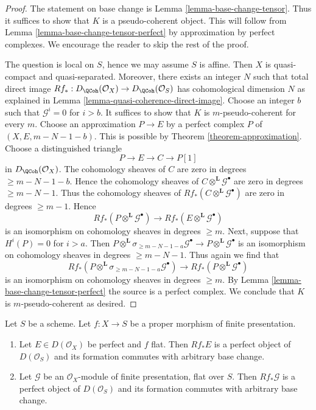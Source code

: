 \begin{proof}
The statement on base change is Lemma \ref{lemma-base-change-tensor}.
Thus it suffices to show that $K$ is a pseudo-coherent object.
This will follow from Lemma \ref{lemma-base-change-tensor-perfect}
by approximation by perfect complexes. We encourage the reader to
skip the rest of the proof.

\medskip\noindent
The question is local on $S$, hence we may assume $S$ is affine.
Then $X$ is quasi-compact and quasi-separated. Moreover, there
exists an integer $N$ such that total direct image
$Rf_* : D_\QCoh(\mathcal{O}_X) \to D_\QCoh(\mathcal{O}_S)$
has cohomological dimension $N$ as explained in
Lemma \ref{lemma-quasi-coherence-direct-image}.
Choose an integer $b$ such that $\mathcal{G}^i = 0$ for $i > b$.
It suffices to show that $K$ is $m$-pseudo-coherent for
every $m$. Choose an approximation $P \to E$ by a perfect complex $P$
of $(X, E, m - N - 1 - b)$. This is possible by
Theorem \ref{theorem-approximation}.
Choose a distinguished triangle
$$
P \to E \to C \to P[1]
$$
in $D_\QCoh(\mathcal{O}_X)$. The cohomology sheaves of $C$ are zero
in degrees $\geq m - N - 1 - b$. Hence the cohomology sheaves of
$C \otimes^\mathbf{L} \mathcal{G}^\bullet$ are zero in degrees
$\geq m - N - 1$. Thus the cohomology sheaves of
$Rf_*(C \otimes^\mathbf{L} \mathcal{G}^\bullet)$
are zero in degrees $\geq m - 1$.
Hence
$$
Rf_*(P \otimes^\mathbf{L} \mathcal{G}^\bullet) \to
Rf_*(E \otimes^\mathbf{L} \mathcal{G}^\bullet)
$$
is an isomorphism on cohomology sheaves in degrees $\geq m$.
Next, suppose that $H^i(P) = 0$ for $i > a$. Then
$
P \otimes^\mathbf{L} \sigma_{\geq m - N - 1 - a}\mathcal{G}^\bullet
\longrightarrow
P \otimes^\mathbf{L} \mathcal{G}^\bullet
$
is an isomorphism on cohomology sheaves in degrees $\geq m - N - 1$.
Thus again we find that
$$
Rf_*(P \otimes^\mathbf{L} \sigma_{\geq m - N - 1 - a}\mathcal{G}^\bullet) \to
Rf_*(P \otimes^\mathbf{L} \mathcal{G}^\bullet)
$$
is an isomorphism on cohomology sheaves in degrees $\geq m$.
By Lemma \ref{lemma-base-change-tensor-perfect} the source
is a perfect complex.
We conclude that $K$ is $m$-pseudo-coherent as desired.
\end{proof}

\begin{lemma}
\label{lemma-flat-proper-perfect-direct-image-general}
Let $S$ be a scheme. Let $f : X \to S$ be a proper
morphism of finite presentation.
\begin{enumerate}
\item Let $E \in D(\mathcal{O}_X)$ be perfect and $f$ flat. Then
$Rf_*E$ is a perfect object of $D(\mathcal{O}_S)$ and its formation
commutes with arbitrary base change.
\item Let $\mathcal{G}$ be an $\mathcal{O}_X$-module of finite presentation,
flat over $S$. Then $Rf_*\mathcal{G}$ is a perfect object of
$D(\mathcal{O}_S)$ and its formation commutes with arbitrary base change.
\end{enumerate}
\end{lemma}

